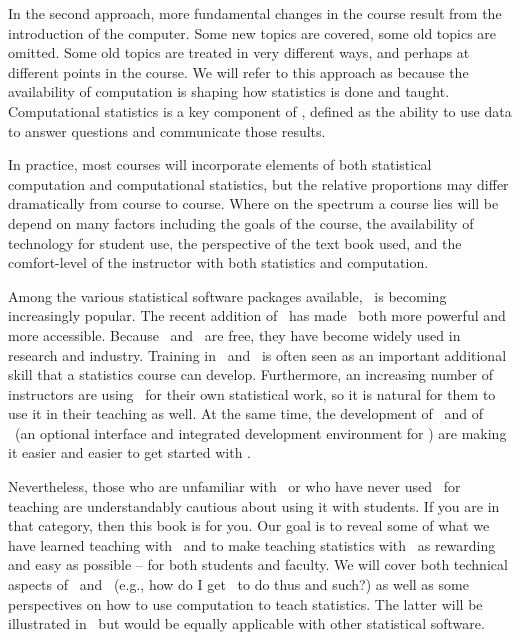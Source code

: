 \documentclass{tufte-book}\usepackage[]{graphicx}\usepackage[]{xcolor}
\begin{document}
In the second approach, more fundamental changes in the course result from the introduction of the computer.  Some new topics are covered, some old topics are omitted.  Some old topics are treated in very different ways, and perhaps at different points in the course.  We will refer to this approach as  because the availability of computation is shaping how statistics is done and taught.  Computational statistics is a key component of , defined as the ability to use data to answer questions and communicate those results.

%
In practice, most courses will incorporate elements of both 
statistical computation and computational statistics, but the relative 
proportions may differ dramatically from course to course.
Where on the spectrum a course lies will be depend
on many factors including 
the goals of the course, 
the availability of technology for student use, 
the perspective of the text book used,
and the comfort-level 
of the instructor with both statistics and computation.


Among the various statistical software packages available, \R\ is becoming
increasingly popular.  The recent addition of \RStudio\ has made \R\ both
more powerful and more accessible.
Because \R\ and \RStudio\ are free, they
have become widely
used in research and industry. Training in \R\ and \RStudio\ is often seen as an 
important additional skill that a statistics course can develop.  Furthermore,
an increasing number of instructors are using \R\ for their own statistical
work, so it is natural for them to use it in their teaching as well.
At the same time, the development of \R\ and of \RStudio\ (an optional 
interface and integrated development environment for \R) are making it
easier and easier to get started with \R.

Nevertheless, those who are unfamiliar with \R\ or who have never used \R\ for teaching are understandably cautious about using it with students.  If you are in that category, then this book is for you.  Our goal is to reveal some of what we have learned teaching with \R\ and to make teaching statistics with \R\ as rewarding and easy as possible -- for both students and faculty. We will cover both technical aspects of \R\ and \RStudio\ (e.g., how do I get \R\ to do thus and such?) as well as some perspectives on how to use computation to teach statistics. The latter will be illustrated in \R\ but would be equally applicable with other statistical software.
\end{document}
